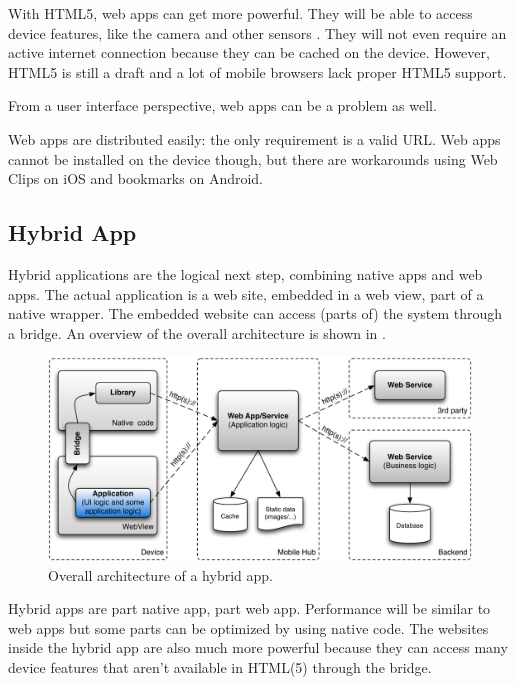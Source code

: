 With HTML5, web apps can get more powerful. They will be able to access device features, like the camera and other sensors \cite{MobileHTML5}. They will not even require an active internet connection because they can be cached on the device. However, HTML5 is still a draft and a lot of mobile browsers lack proper HTML5 support.

From a user interface perspective, web apps can be a problem as well. 

Web apps are distributed easily: the only requirement is a valid URL. Web apps cannot be installed on the device though, but there are workarounds using Web Clips on iOS \cite{Safari:webclips} and bookmarks on Android. 

\subsection{Hybrid App}

Hybrid applications are the logical next step, combining native apps and web apps. The actual application is a web site, embedded in a web view, part of a native wrapper. The embedded website can access (parts of) the system through a bridge. An overview of the overall architecture is shown in . 

\begin{figure}[h!]
    \begin{center}
        \includegraphics[width=\textwidth]{figs/hybrid.pdf}
        \caption{
            Overall architecture of a hybrid app.
        }
        \label{fig:hybrid}
    \end{center}
\end{figure}

Hybrid apps are part native app, part web app. Performance will be similar to web apps but some parts can be optimized by using native code. The websites inside the hybrid app are also much more powerful because they can access many device features that aren't available in HTML(5) through the bridge.

